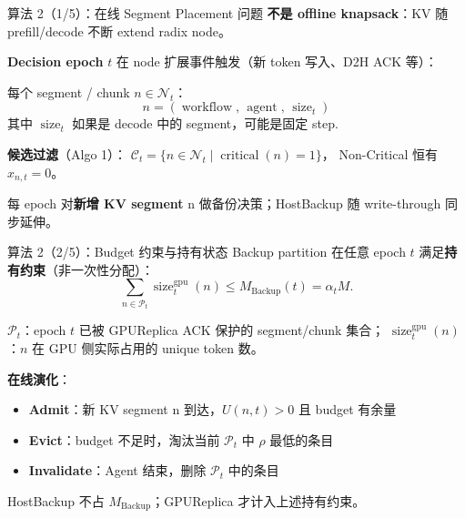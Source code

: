 \documentclass[aspectratio=43]{beamer}
\begin{document}
\begin{frame}{算法 2（1/5）：在线 Segment Placement 问题}
  \small
  \textbf{不是 offline knapsack}：KV 随 prefill/decode 不断 extend radix node。

  \vspace{0.08cm}
  \textbf{Decision epoch} $t$ 在 node 扩展事件触发（新 token 写入、D2H ACK 等）：

  \vspace{0.06cm}
  每个 segment / chunk $n \in \mathcal{N}_t$：
  \[
    n = (\operatorname{workflow},\,\operatorname{agent},\,\operatorname{size}_t)
  \]
  其中 $\operatorname{size}_t$ 如果是 decode 中的 segment，可能是固定 step.

  \vspace{0.06cm}
  \textbf{候选过滤}（Algo 1）：
  $\mathcal{C}_t = \{ n \in \mathcal{N}_t \mid \operatorname{critical}(n)=1 \}$，
  Non-Critical 恒有 $x_{n,t}=0$。

  \vspace{0.04cm}
  \footnotesize
  每 epoch 对\textbf{新增 KV segment} n 做备份决策；HostBackup 随 write-through 同步延伸。
\end{frame}

\begin{frame}{算法 2（2/5）：Budget 约束与持有状态}
  \small
  Backup partition 在任意 epoch $t$ 满足\textbf{持有约束}（非一次性分配）：
  \[
    \sum_{n \in \mathcal{P}_t} \operatorname{size}^{\mathrm{gpu}}_t(n)
    \le
    M_{\mathrm{Backup}}(t) = \alpha_t M .
  \]

  \vspace{0.06cm}
  $\mathcal{P}_t$：epoch $t$ 已被 GPUReplica ACK 保护的 segment/chunk 集合；
  $\operatorname{size}^{\mathrm{gpu}}_t(n)$：$n$ 在 GPU 侧实际占用的 unique token 数。

  \vspace{0.08cm}
  \textbf{在线演化}：
  \begin{itemize}
    \item \textbf{Admit}：新 KV segment n 到达，$U(n,t)>0$ 且 budget 有余量
    \item \textbf{Evict}：budget 不足时，淘汰当前 $\mathcal{P}_t$ 中 $\rho$ 最低的条目
    \item \textbf{Invalidate}：Agent 结束，删除 $\mathcal{P}_t$ 中的条目
  \end{itemize}

  \vspace{0.04cm}
  \footnotesize
  HostBackup 不占 $M_{\mathrm{Backup}}$；GPUReplica 才计入上述持有约束。
\end{frame}
\end{document}
